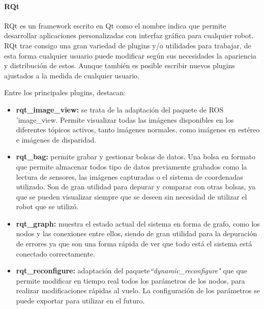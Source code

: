 \paragraph{RQt} \hspace{0pt}

RQt es un framework escrito en Qt como el nombre indica que permite desarrollar
aplicaciones personalizadas con interfaz gráfica para cualquier robot. RQt trae
consigo una gran variedad de plugins y/o utilidades para trabajar, de esta forma
cualquier usuario puede modificar según sus necesidades la apariencia y
distribución de estos. Aunque también es posible escribir nuevos plugins
ajustados a la medida de cualquier usuario.

Entre los principales plugins, destacan:

\begin{itemize}
  \item \textbf{rqt\_image\_view:} se trata de la adaptación del paquete de ROS
  'image\_view. Permite visualizar todas las imágenes disponibles en los
  diferentes tópicos activos, tanto imágenes normales, como imágenes en
  estéreo e imágenes de disparidad.
  \item \textbf{rqt\_bag:} permite grabar y gestionar bolsas de datos. Una bolsa
  en formato que permite almacenar todos tipo de datos previamente grabados como
  la lectura de sensores, las imágenes capturadas o el sistema de coordenadas
  utilizado. Son de gran utilidad para depurar y comparar con otras bolsas, ya
  que se pueden visualizar siempre que se deseen sin necesidad de utilizar el
  robot que se utilizó.
  \item \textbf{rqt\_graph:} muestra el estado actual del sistema en forma de
  grafo, como los nodos y las conexiones entre ellos, siendo de gran utilidad
  para la depuración de errores ya que son una forma rápida de ver que todo está
  el sistema está conectado correctamente.
  \item \textbf{rqt\_reconfigure:} adaptación del
  paquete\textit{``dynamic\_reconfigure"} que que permite modificar en tiempo
  real todos los parámetros de los nodos, para realizar modificaciones rápidas
  al vuelo. La configuración de los parámetros se puede exportar para utilizar
  en el futuro.
\end{itemize}


